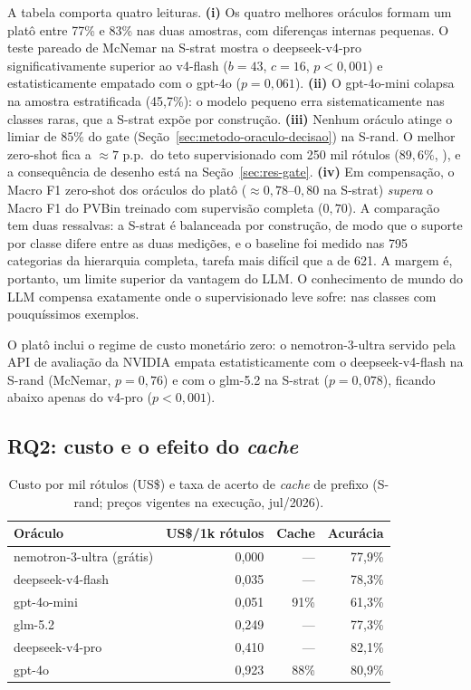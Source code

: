 A tabela comporta quatro leituras. \textbf{(i)} Os quatro melhores oráculos formam um platô entre 77\% e 83\% nas
duas amostras, com diferenças internas pequenas. O teste pareado de McNemar
na S-strat mostra o deepseek-v4-pro significativamente superior ao v4-flash
($b=43$, $c=16$, $p<0{,}001$) e estatisticamente empatado com o gpt-4o
($p=0{,}061$). \textbf{(ii)} O gpt-4o-mini colapsa na amostra estratificada
(45,7\%): o modelo pequeno erra sistematicamente nas classes raras, que a
S-strat expõe por construção. \textbf{(iii)} Nenhum oráculo atinge o limiar de $85\%$ do gate
(Seção~\ref{sec:metodo-oraculo-decisao}) na S-rand. O melhor zero-shot fica a
$\approx 7$ p.p.\ do teto supervisionado com 250 mil rótulos ($89{,}6\%$,
\citealp{Daru2024Dissertacao}), e a consequência de desenho está na
Seção~\ref{sec:res-gate}. \textbf{(iv)} Em compensação, o Macro F1 zero-shot dos oráculos do platô
($\approx 0{,}78$--$0{,}80$ na S-strat) \emph{supera} o Macro F1 do PVBin
treinado com supervisão completa ($0{,}70$). A comparação tem duas ressalvas:
a S-strat é balanceada por construção, de modo que o suporte por classe difere
entre as duas medições, e o baseline foi medido nas 795 categorias da
hierarquia completa, tarefa mais difícil que a de 621. A margem é, portanto,
um limite superior da vantagem do LLM. O conhecimento de mundo do LLM
compensa exatamente onde o supervisionado leve sofre: nas classes com
pouquíssimos exemplos.

O platô inclui o regime de custo monetário zero: o nemotron-3-ultra servido
pela API de avaliação da NVIDIA empata estatisticamente com o
deepseek-v4-flash na S-rand (McNemar, $p=0{,}76$) e com o glm-5.2 na S-strat
($p=0{,}078$), ficando abaixo apenas do v4-pro ($p<0{,}001$).

\subsection{RQ2: custo e o efeito do \textit{cache}}
\label{sec:res-e0-rq2}

\begin{table}[htb]
\centering
\caption{Custo por mil rótulos (US\$) e taxa de acerto de \textit{cache}
de prefixo (S-rand; preços vigentes na execução, jul/2026).}
\label{tab:e0-custo}
\small
\begin{tabular}{l rr r}
\toprule
\textbf{Oráculo} & \textbf{US\$/1k rótulos} & \textbf{Cache} & \textbf{Acurácia} \\
\midrule
nemotron-3-ultra (grátis) & 0,000 & — & 77,9\% \\
deepseek-v4-flash & 0,035 & —      & 78,3\% \\
gpt-4o-mini       & 0,051 & 91\%   & 61,3\% \\
glm-5.2           & 0,249 & —      & 77,3\% \\
deepseek-v4-pro   & 0,410 & —      & 82,1\% \\
gpt-4o            & 0,923 & 88\%   & 80,9\% \\
\bottomrule
\end{tabular}
\end{table}

